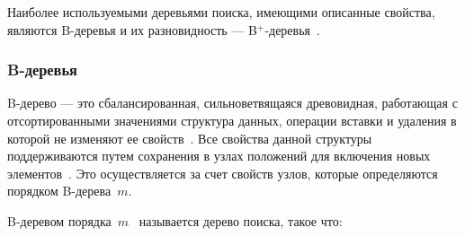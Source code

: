 Наиболее используемыми деревьями поиска, имеющими описанные свойства, являются
B-деревья и их разновидность --- B$^+$-деревья~\cite{arki}.

\subsubsection{B-деревья}

B-дерево --- это сбалансированная, сильноветвящаяся древовидная,
работающая с отсортированными значениями структура данных, операции вставки и
удаления в которой не изменяют ее свойств~\cite{loshad}. Все свойства данной
структуры поддерживаются путем сохранения в узлах положений для включения новых
элементов~\cite{baw}. Это осуществляется за счет свойств узлов, которые
определяются порядком B-дерева~$m$.

B-деревом порядка~$m$~\cite{baw, arki} называется дерево поиска, такое
что:

